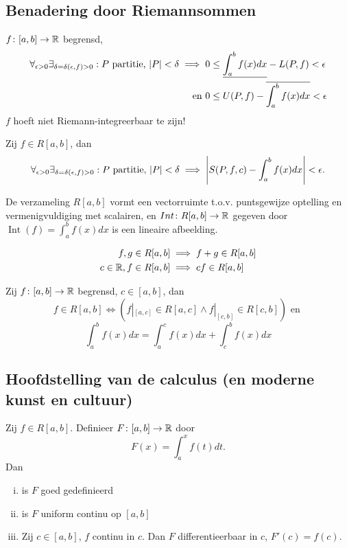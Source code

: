 \documentclass{2wa40summary}
\begin{document}
		\subsection{Benadering door Riemannsommen}
			\begin{theorem}
				$ f\colon [a,b] \to \mathbb{R}  $ begrensd,
				\begin{align*}
					\forall_{\epsilon >0} \exists_{\delta = \delta (\epsilon,f)>0}: P \text{ partitie, } \abs{P}<\delta \implies 0 &\le \ul{\int_a^b f(x) dx} - L(P,f) < \epsilon  \\
					\text{ en }0 &\le U(P,f) - \overline{\int_a^b f(x)dx} <\epsilon
				 \end{align*}
				 \opm $f$ hoeft niet Riemann-integreerbaar te zijn!
			\end{theorem}
			\begin{theorem}
				Zij $ f \in R[a,b] $, dan
				\[ 
					\forall_{\epsilon >0} \exists_{\delta = \delta (\epsilon,f)>0}: P \text{ partitie, } \abs{P}<\delta \implies \abs{S(P,f,c) - \int_a^b f(x) dx} < \epsilon.
				 \]
			\end{theorem}
			\begin{theorem}[\text{[K]} 6.3.1]
				De verzameling $R[a,b]$ vormt een vectorruimte t.o.v. puntsgewijze optelling en vermenigvuldiging met scalairen, en $ \mathop{Int}\colon R[a,b] \to \mathbb{R} $ gegeven door $ \mathop{Int}(f) = \int_a^b f(x)dx $ is een lineaire afbeelding.
				\begin{gevolg}
					\begin{align*}
						f,g \in R[a,b] &\implies f+g \in R[a,b] \\
						c \in \mathbb{R}, f\in R[a,b] &\implies cf \in R[a,b]
					 \end{align*}
				\end{gevolg}
			\end{theorem}
			\begin{theorem}
				Zij $f\colon [a,b] \to \mathbb{R}$ begrensd, $c\in [a,b]$, dan
				\[ 
					f \in R[a,b] \iff (f|_{[a,c]} \in R[a,c] \wedge f|_{[c,b]} \in R[c,b]) \text{ en }
				 \]
				 \[ 
					 \int_a^b f(x)dx = \int_a^c f(x) dx + \int_c^b f(x) dx
				  \]
			\end{theorem}
			
		\subsection{Hoofdstelling van de calculus (en moderne kunst en cultuur)}
			\begin{theorem}
				Zij $f \in R[a,b]$. Definieer $ F\colon [a,b] \to \mathbb{R} $ door 
				\[ 
					F(x)=\int_a^x f(t)dt.
				 \]
				 Dan
				 \begin{enumerate}[(i)]
				 	\item is $F$ goed gedefinieerd
				 	\item is $F$ uniform continu op $ [a,b] $
				 	\item Zij $ c \in [a,b] $, $f$ continu in $c$. Dan $F$ differentieerbaar in $c$, $ F'(c)=f(c) $.
				 \end{enumerate}
			\end{theorem}
			
\end{document}
